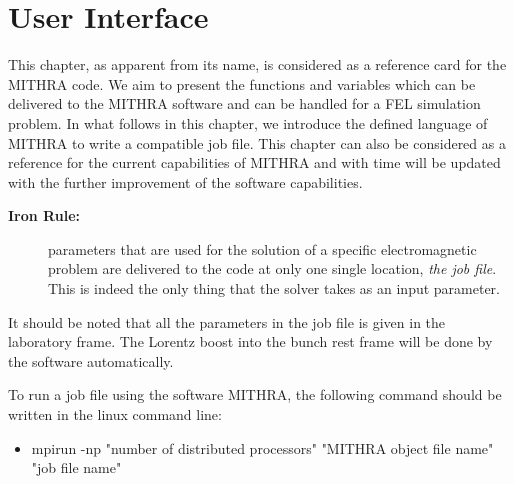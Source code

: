 \chapter{User Interface}
\label{chapter_refcard}

This chapter, as apparent from its name, is considered as a reference card for the MITHRA code.
%
We aim to present the functions and variables which can be delivered to the MITHRA software and can be handled for a FEL simulation problem.
%
In what follows in this chapter, we introduce the defined language of MITHRA to write a compatible job file.
%
This chapter can also be considered as a reference for the current capabilities of MITHRA and with time will be updated with the further improvement of the software capabilities.
%
\begin{description}
\item[\textbf{Iron Rule:}] parameters that are used for the solution of a specific electromagnetic problem are delivered to the code at only one single location, \emph{the job file}. This is indeed the only thing that the solver takes as an input parameter.
\end{description}
%
It should be noted that all the parameters in the job file is given in the laboratory frame.
%
The Lorentz boost into the bunch rest frame will be done by the software automatically.

To run a job file using the software MITHRA, the following command should be written in the linux command line:

\begin{itemize}
	\item  mpirun -np "number of distributed processors" "MITHRA object file name" "job file name"
\end{itemize}

